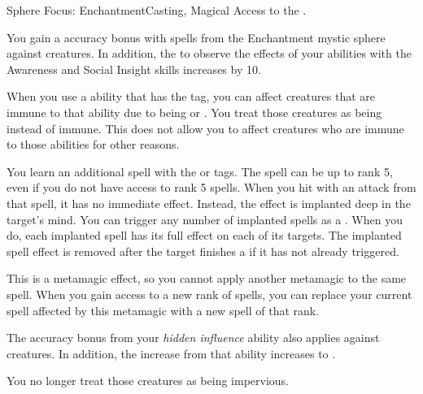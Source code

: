   \begin{magicalfeat}{Sphere Focus: Enchantment}{Casting, Magical}
    \featpre Access to the  .

     You gain a  accuracy bonus with spells from the Enchantment mystic sphere against \unaware creatures.
    In addition, the  to observe the effects of your  abilities with the Awareness and Social Insight skills increases by 10.

     When you use a \magical ability that has the  tag, you can affect creatures that are immune to that ability due to being  or .
    You treat those creatures as being \impervious instead of immune.
    This does not allow you to affect creatures who are immune to those abilities for other reasons.

     You learn an additional  spell with the \atCompulsion or \atEmotion tags.
    The spell can be up to rank 5, even if you do not have access to rank 5 spells.
    When you hit with an attack from that spell, it has no immediate effect.
    Instead, the effect is implanted deep in the target's mind.
    You can trigger any number of implanted spells as a .
    When you do, each implanted spell has its full effect on each of its targets.
    The implanted spell effect is removed after the target finishes a  if it has not already triggered.

    This is a metamagic effect, so you cannot apply another metamagic to the same spell.
    When you gain access to a new rank of spells, you can replace your current spell affected by this metamagic with a new spell of that rank.

     The accuracy bonus from your \textit{hidden influence} ability also applies against \partiallyunaware creatures.
    In addition, the  increase from that ability increases to .

     You no longer treat those creatures as being impervious.
  \end{magicalfeat}

